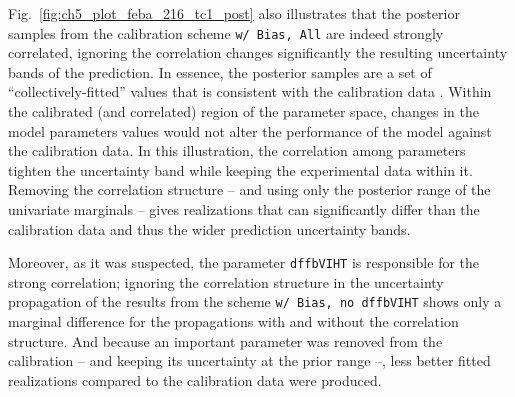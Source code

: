 Fig.~\ref{fig:ch5_plot_feba_216_tc1_post} also illustrates that the posterior samples from the calibration scheme \texttt{w/ Bias, All} are indeed strongly correlated, ignoring the correlation changes significantly the resulting uncertainty bands of the prediction.
In essence, the posterior samples are a set of ``collect\-ively-fitted'' values that is consistent with the calibration data \cite{Gutenkunst2007} .
Within the calibrated (and correlated) region of the parameter space, changes in the model parameters values would not alter the performance of the model against the calibration data.
In this illustration, the correlation among parameters tighten the uncertainty band while keeping the experimental data within it.
Removing the correlation structure -- and using only the posterior range of the univariate marginals -- gives realizations that can significantly differ than the calibration data and thus the wider prediction uncertainty bands.

Moreover, as it was suspected, the parameter \texttt{dffbVIHT} is responsible for the strong correlation;
ignoring the correlation structure in the uncertainty propagation of the results from the scheme  \texttt{w/ Bias, no dffbVIHT} shows only a marginal difference for the propagations with and without the correlation structure.
And because an important parameter was removed from the calibration -- and keeping its uncertainty at the prior range --, less better fitted realizations compared to the calibration data were produced.

